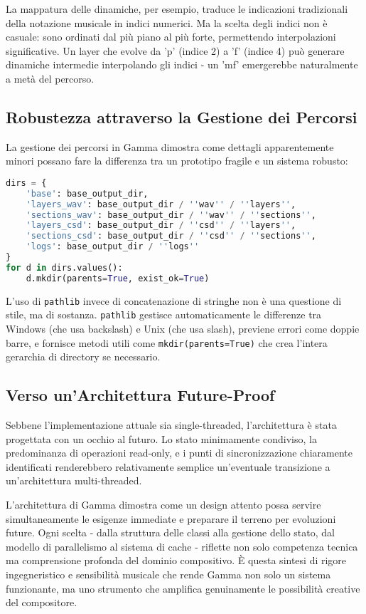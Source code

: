 La mappatura delle dinamiche, per esempio, traduce le indicazioni tradizionali della notazione musicale in indici numerici. Ma la scelta degli indici non è casuale: sono ordinati dal più piano al più forte, permettendo interpolazioni significative. Un layer che evolve da 'p' (indice 2) a 'f' (indice 4) può generare dinamiche intermedie interpolando gli indici - un 'mf' emergerebbe naturalmente a metà del percorso.
\subsection{Robustezza attraverso la Gestione dei Percorsi}
La gestione dei percorsi in Gamma dimostra come dettagli apparentemente minori possano fare la differenza tra un prototipo fragile e un sistema robusto:

\begin{lstlisting}[language=Python]
dirs = {
    'base': base_output_dir,
    'layers_wav': base_output_dir / ''wav'' / ''layers'',
    'sections_wav': base_output_dir / ''wav'' / ''sections'',
    'layers_csd': base_output_dir / ''csd'' / ''layers'',
    'sections_csd': base_output_dir / ''csd'' / ''sections'',
    'logs': base_output_dir / ''logs''
}
for d in dirs.values():
    d.mkdir(parents=True, exist_ok=True)
\end{lstlisting}

L'uso di \texttt{pathlib} invece di concatenazione di stringhe non è una questione di stile, ma di sostanza. \texttt{pathlib} gestisce automaticamente le differenze tra Windows (che usa backslash) e Unix (che usa slash), previene errori come doppie barre, e fornisce metodi utili come \texttt{mkdir(parents=True)} che crea l'intera gerarchia di directory se necessario.
\subsection{Verso un'Architettura Future-Proof}
Sebbene l'implementazione attuale sia single-threaded, l'architettura è stata progettata con un occhio al futuro. Lo stato minimamente condiviso, la predominanza di operazioni read-only, e i punti di sincronizzazione chiaramente identificati renderebbero relativamente semplice un'eventuale transizione a un'architettura multi-threaded.

L'architettura di Gamma dimostra come un design attento possa servire simultaneamente le esigenze immediate e preparare il terreno per evoluzioni future. Ogni scelta - dalla struttura delle classi alla gestione dello stato, dal modello di parallelismo al sistema di cache - riflette non solo competenza tecnica ma comprensione profonda del dominio compositivo. È questa sintesi di rigore ingegneristico e sensibilità musicale che rende Gamma non solo un sistema funzionante, ma uno strumento che amplifica genuinamente le possibilità creative del compositore.